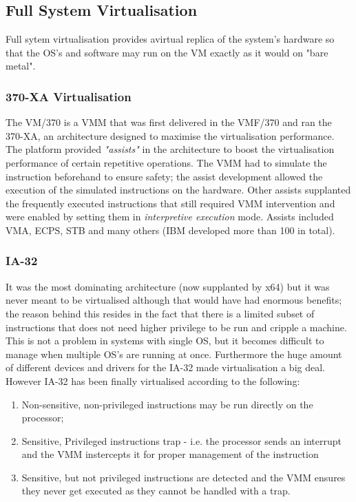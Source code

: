 \subsection{Full System Virtualisation}
Full sytem virtualisation provides avirtual replica of the system's hardware so that the OS's and software may run on
the VM exactly as it would on "bare metal".
\subsubsection{370-XA Virtualisation}
The VM/370 is a VMM that was first delivered in the VMF/370 and ran the 370-XA, an architecture designed to maximise 
the virtualisation performance. The platform provided \textit{"assists"} in the architecture to boost the
virtualisation performance of certain repetitive operations. The VMM had to simulate the instruction beforehand to 
ensure safety; the assist development allowed the execution of the simulated instructions on the hardware. Other 
assists supplanted the frequently executed instructions that still required VMM intervention and were enabled by
setting them in \textit{interpretive execution} mode. Assists included VMA, ECPS, STB and many others (IBM developed
more than 100 in total).
\subsubsection{IA-32} 
It was the most dominating architecture (now supplanted by x64) but it was never meant to be virtualised although that
would have had enormous benefits; the reason behind this resides in the fact that there is a limited subset of
instructions that does not need higher privilege to be run and cripple a machine. This is not a problem in systems 
with single OS, but it becomes difficult to manage when multiple OS's are running at once. Furthermore the huge amount 
of different devices and drivers for the IA-32 made virtualisation a big deal. However IA-32 has been finally
virtualised according to the following:
\begin{enumerate} 
    \item Non-sensitive,
        non-privileged instructions may be run directly on the processor;
    \item Sensitive, Privileged instructions trap - i.e. the processor sends an interrupt and the VMM instercepts it 
        for proper management of the instruction
    \item Sensitive, but not privileged instructions are detected and the VMM ensures they never get executed as they 
        cannot be handled with a trap.
\end{enumerate}
